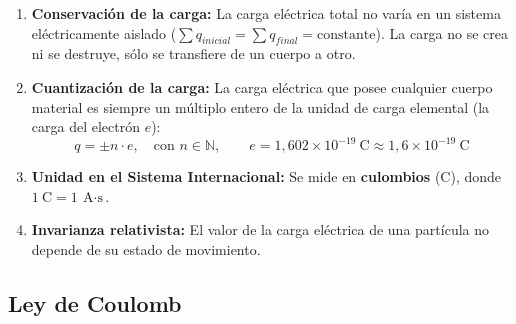 \begin{definicion}
\begin{enumerate}[leftmargin=*]
    \item \textbf{Conservación de la carga:} La carga eléctrica total no varía en un sistema eléctricamente aislado ($\sum q_{inicial} = \sum q_{final} = \text{constante}$). La carga no se crea ni se destruye, sólo se transfiere de un cuerpo a otro.
    \item \textbf{Cuantización de la carga:} La carga eléctrica que posee cualquier cuerpo material es siempre un múltiplo entero de la unidad de carga elemental (la carga del electrón $e$):
    \begin{equation}
        q = \pm n \cdot e, \quad \text{con } n \in \mathbb{N}, \qquad e = 1{,}602 \times 10^{-19}\ \si{\coulomb} \approx 1{,}6 \times 10^{-19}\ \si{\coulomb}
    \end{equation}
    \item \textbf{Unidad en el Sistema Internacional:} Se mide en \textbf{culombios} ($\si{\coulomb}$), donde $1\ \si{\coulomb} = 1\ \si{\ampere\cdot\second}$.
    \item \textbf{Invarianza relativista:} El valor de la carga eléctrica de una partícula no depende de su estado de movimiento.
\end{enumerate}
\end{definicion}

\subsection{Ley de Coulomb}

